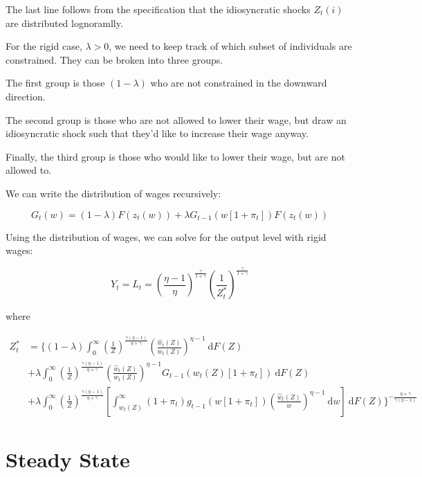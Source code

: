 \documentclass[12pt,a4paper]{scrartcl}            %
\begin{document}
The last line follows from the specification that the idiosyncratic shocks $Z_t(i)$ are distributed lognoramlly.

For the rigid case, $\lambda > 0$, we need to keep track of which subset of individuals are constrained.
They can be broken into three groups.

The first group is those $(1 - \lambda)$ who are not constrained in the downward direction.

The second group is those who are not allowed to lower their wage, but draw an idiosyncratic shock such that they'd like to increase their wage anyway.

Finally, the third group is those who would like to lower their wage, but are not allowed to.

We can write the distribution of wages recursively:

\begin{equation}
    \label{eq:wage_distribution}
    G_t(w) = (1 - \lambda) F(z_t(w)) + \lambda G_{t-1}\left(w[1 + \pi_t]\right)F(z_t(w))
\end{equation}

Using the distribution of wages, we can solve for the output level with rigid wages:

\begin{equation}
    \label{eq:output_rigid}
    Y_t = L_t = \left(\frac{\eta - 1}{\eta} \right)^{\frac{\gamma}{1 + \gamma}}\left( \frac{1}{Z_t^*} \right)^{\frac{\gamma}{1 + \gamma}}
\end{equation}

where

\begin{equation}
    \label{eq:z_star}
    \begin{split}
    Z_t^* &= \Big\{(1 - \lambda) \int_{0}^{\infty} \! \left( \frac{1}{Z} \right)^{\frac{\gamma(\eta - 1)}{\eta + \gamma}} \left( \frac{\hat{w}_t(Z)}{w_t(Z)} \right)^{\eta - 1}\ \mathrm{d}F(Z) \\
          &+            \lambda  \int_{0}^{\infty} \! \left( \frac{1}{Z} \right)^{\frac{\gamma(\eta - 1)}{\eta + \gamma}} \left( \frac{\hat{w}_t(Z)}{w_t(Z)} \right)^{\eta - 1} G_{t-1}\left( w_t(Z)[1 + \pi_t] \right)                                                     \ \mathrm{d}F(Z)\\
          &+            \lambda  \int_{0}^{\infty} \! \left( \frac{1}{Z} \right)^{\frac{\gamma(\eta - 1)}{\eta + \gamma}} \left[ \int_{w_t(Z)}^{\infty} (1 + \pi_t)g_{t-1}\left( w[1 + \pi_t] \right) \left( \frac{\hat{w}_t(Z)}{w} \right)^{\eta - 1}\ \mathrm{d}w \right] \ \mathrm{d}F(Z)
            \Big\}^{-\frac{\eta + \gamma}{\gamma(\eta - 1)}}
    \end{split}
\end{equation}



\section{Steady State}
\label{sec:steady_state}




\end{document}
